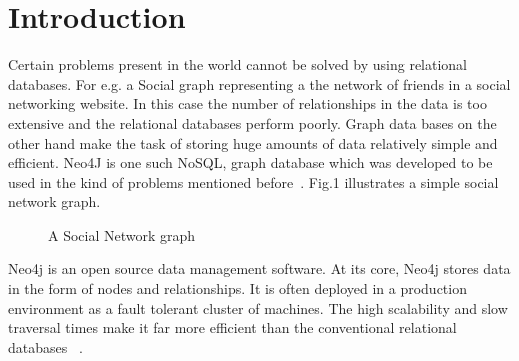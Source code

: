 \documentclass[9pt,twocolumn,twoside]{../../styles/osajnl}
\begin{document}
\section{Introduction}
Certain problems present in the world cannot be solved by using relational databases. For e.g. a Social  graph representing a \GE the network of friends in a social networking website. In this case the number of relationships in the data is too extensive and the relational databases perform poorly.  Graph data bases on the other hand make the task of storing huge \TE {} amounts of data relatively simple and efficient. Neo4J is one such NoSQL, graph database which was developed to be used in the kind of problems mentioned before~\cite{www-neo4j-intro2}. Fig.1 illustrates a simple social network graph. 
\begin{figure}[htbp]
\centering
{}
\caption{A Social Network graph ~\cite{www-graph-img}}
\label{fig:false-color}
\end{figure}


Neo4j is an open source data management software. At its core, Neo4j stores data in the form of nodes and relationships. It is often deployed in a production environment as a fault tolerant cluster of machines. The high scalability and slow traversal times make it far more efficient than the conventional relational databases ~\cite{www-neo4j-intro}. 
\end{document}
